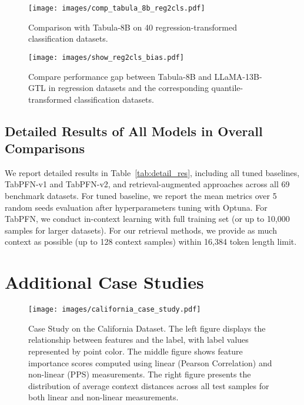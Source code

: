 \begin{figure}[t]
    \centering
    \texttt{[image: images/comp\_tabula\_8b\_reg2cls.pdf]}
    \caption{Comparison with Tabula-8B on 40 regression-transformed classification datasets.}
    \label{fig:comp_tabula_reg2cls}
\end{figure}

\begin{figure}[t]
    \centering
    \texttt{[image: images/show\_reg2cls\_bias.pdf]}
    \caption{Compare performance gap between Tabula-8B and LLaMA-13B-GTL in regression datasets and the corresponding quantile-transformed classification datasets.}
    \label{fig:comp_reg2cls_per}
\end{figure}

\subsection{Detailed Results of All Models in Overall Comparisons}
\label{app:exp_detail_all_res}
We report detailed results in Table~\ref{tab:detail_res}, including all tuned baselines, TabPFN-v1 and TabPFN-v2, and retrieval-augmented approaches across all 69 benchmark datasets. For tuned baseline, we report the mean metrics over 5 random seeds evaluation after hyperparameters tuning with Optuna. For TabPFN, we conduct in-context learning with full training set (or up to 10,000 samples for larger datasets). For our retrieval methods, we provide as much context as possible (up to 128 context samples) within 16,384 token length limit.


\section{Additional Case Studies}
\label{app:case_study}

\begin{figure}[t]
    \centering
    \texttt{[image: images/california\_case\_study.pdf]}
    \caption{Case Study on the California Dataset. The left figure displays the relationship between features and the label, with label values represented by point color. The middle figure shows feature importance scores computed using linear (Pearson Correlation) and non-linear (PPS) measurements. The right figure presents the distribution of average context distances across all test samples for both linear and non-linear measurements.}
    \label{fig:case_calif}
\end{figure}

